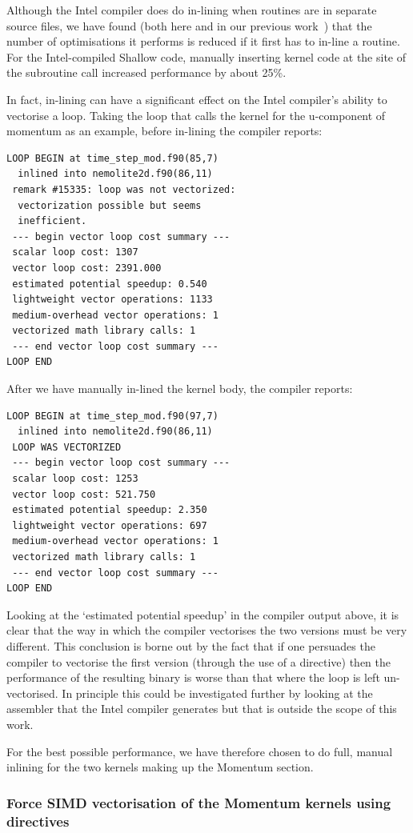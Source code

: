 \documentclass[journal]{IEEEtran}
\begin{document}
Although the Intel compiler does do in-lining when routines are in
separate source files, we have found (both here and in our previous
work~\cite{shallow_psykal}) that the number of optimisations it
performs is reduced if it first has to in-line a routine. For the
Intel-compiled Shallow code, manually inserting kernel code at the
site of the subroutine call increased performance by about 25\%.

In fact, in-lining can have a significant effect on the Intel
compiler's ability to vectorise a loop. Taking the loop that calls the
kernel for the u-component of momentum as an example, before in-lining
the compiler reports:
\begin{verbatim}
LOOP BEGIN at time_step_mod.f90(85,7) 
  inlined into nemolite2d.f90(86,11)
 remark #15335: loop was not vectorized: 
  vectorization possible but seems 
  inefficient. 
 --- begin vector loop cost summary ---
 scalar loop cost: 1307 
 vector loop cost: 2391.000 
 estimated potential speedup: 0.540 
 lightweight vector operations: 1133 
 medium-overhead vector operations: 1 
 vectorized math library calls: 1 
 --- end vector loop cost summary ---
LOOP END
\end{verbatim}
After we have manually in-lined the kernel body, the compiler reports:
\begin{verbatim}
LOOP BEGIN at time_step_mod.f90(97,7) 
  inlined into nemolite2d.f90(86,11)
 LOOP WAS VECTORIZED
 --- begin vector loop cost summary ---
 scalar loop cost: 1253 
 vector loop cost: 521.750 
 estimated potential speedup: 2.350 
 lightweight vector operations: 697 
 medium-overhead vector operations: 1 
 vectorized math library calls: 1 
 --- end vector loop cost summary ---
LOOP END
\end{verbatim}
Looking at the `estimated potential speedup' in the compiler output
above, it is clear that the way in which the compiler vectorises the
two versions must be very different. This conclusion is borne out by
the fact that if one persuades the compiler to vectorise the first
version (through the use of a directive) then the performance of the
resulting binary is worse than that where the loop is left
un-vectorised. In principle this could be investigated further by
looking at the assembler that the Intel compiler generates but that is
outside the scope of this work.

For the best possible performance, we have therefore chosen to do full, manual
inlining for the two kernels making up the Momentum section.

\subsubsection{Force SIMD vectorisation of the Momentum kernels 
 using directives}
\end{document}
